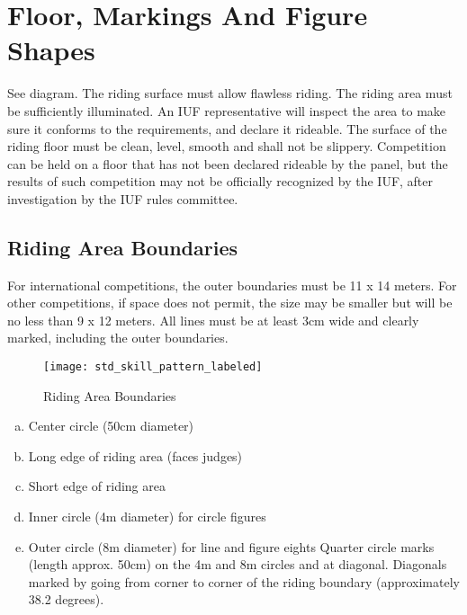 \section{Floor, Markings And Figure Shapes}
See diagram.
The riding surface must allow flawless riding.
The riding area must be sufficiently illuminated.
An IUF representative will inspect the area to make sure it conforms to the requirements, and declare it rideable.
The surface of the riding floor must be clean, level, smooth and shall not be slippery.
Competition can be held on a floor that has not been declared rideable by the panel, but the results of such competition may not be officially recognized by the IUF, after investigation by the IUF rules committee.

\subsection{Riding Area Boundaries \label{subsec:freestyle_floor-markings-figure-shapes_riding-area-boundaries}}
For international competitions, the outer boundaries must be 11 x 14 meters.
For other competitions, if space does not permit, the size may be smaller but will be no less than 9 x 12 meters.
All lines must be at least 3cm wide and clearly marked, including the outer boundaries.

\begin{figure}[h]
\begin{center}
\texttt{[image: std\_skill\_pattern\_labeled]}
\end{center}
\vspace{-20pt}
\caption{Riding Area Boundaries \label{fig:std_skill_pattern_labeled}}
\vspace{-10pt}
\end{figure}

\begin{enumerate}[a.]
\item Center circle (50cm diameter)
\item Long edge of riding area (faces judges)
\item Short edge of riding area
\item Inner circle (4m diameter) for circle figures
\item Outer circle (8m diameter) for line and figure eights Quarter circle marks (length approx. 50cm) on the 4m and 8m circles and at diagonal.
Diagonals marked by going from corner to corner of the riding boundary (approximately 38.2 degrees).
\end{enumerate}


